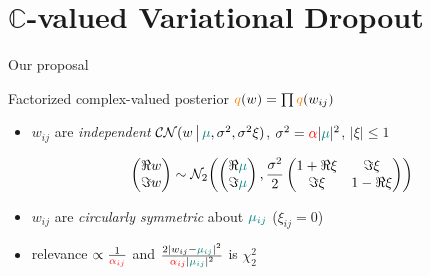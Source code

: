 \documentclass[handout]{beamer}
\newcommand{\cplx}{\mathbb{C}}
\begin{document}


\section{$\cplx$-valued Variational Dropout} %
\label{sec:extension_to_complex_parameters}

\begin{frame}[c]{\insertsection}{Our proposal}

  \medskip
  Factorized complex-valued posterior $
    {\color{orange} q}(w) = \prod {\color{orange} q}(w_{ij})
  $
  \begin{itemize}
    \item $w_{ij}$ are \emph{independent} $
      \mathcal{CN}(
        w\,\big\vert\,
        {\color{teal} \mu},
        \sigma^2,
        \sigma^2 \xi
      )
    $, $
      \sigma^2
        = {\color{red} \alpha} \lvert {\color{teal} \mu} \rvert^2
    $, $\lvert \xi \rvert \leq 1$

    $$
    \begin{pmatrix}
      \Re w \\ \Im w
    \end{pmatrix}
      \sim \mathcal{N}_{2}\biggl(
        \begin{pmatrix}
          \Re {\color{teal} \mu} \\ \Im {\color{teal} \mu}
        \end{pmatrix},
        \frac{\sigma^2}2
          \begin{pmatrix}
            1 + \Re{\xi} & \Im{\xi} \\
            \Im{\xi} & 1 - \Re{\xi}
          \end{pmatrix}
      \biggr)
      $$

    \pause
    \medskip
    \item $w_{ij}$ are \emph{circularly symmetric} about ${\color{teal} \mu_{ij}}$
      ($\xi_{ij} = 0$)

    \medskip
    \item relevance $
      \propto \frac1{{\color{red} \alpha_{ij}}}
    $ and $
      \tfrac{2 \lvert w_{ij} - {\color{teal} \mu_{ij}} \rvert^2}
            {{\color{red} \alpha_{ij}} \lvert {\color{teal} \mu_{ij}} \rvert^2}
    $ is $\chi^2_2$
  \end{itemize}


\end{frame}
\end{document}
